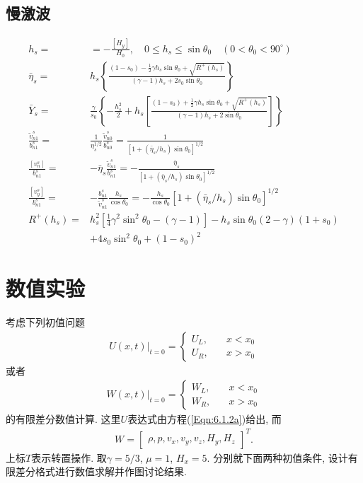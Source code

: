 \documentclass[10.5pt
]{article}
\begin{document}
\subsection{慢激波}
\begin{align}
h_s =&= -\frac{[H_y]}{H_0}, \quad 0 \le h_s \le \sin\theta_0 \quad (0 < \theta_0 < 90^\circ)
\\
\bar{\eta}_s =& h_s \left\{\frac{(1-s_0) - \frac{1}{2} \gamma h_s \sin\theta_0 +
\sqrt{R^+ (h_s)}}{(\gamma-1) h_s + 2 s_0 \sin\theta_0}\right\}
\\
\bar{Y}_s =& \frac{\gamma}{s_0} \left\{-\frac{h_s^2}{2} + h_s \left[\frac{(1-s_0) +
\frac{1}{2} \gamma h_s \sin\theta_0 + \sqrt{R^+ (h_s)}}{(\gamma-1) h_s + 2
\sin\theta_0}\right]\right\}
\\
\frac{\tilde{v}_{n1}^s}{b_{n1}^s} =& \frac{1}{\eta_s^{1/2}}
\frac{\tilde{v}_{n0}^s}{b_{n0}^s} = \frac{1}{[1+(\bar{\eta}_s/h_s)\sin\theta_0]^{1/2}}
\\
\frac{[v_n^s]}{b_{n1}^s} =& - \bar{\eta}_s \frac{\tilde{v}_{n1}^s}{b_{n1}^s} =
-\frac{\bar{\eta}_s}{[1+(\bar{\eta}_s/h_s)\sin\theta_0]^{1/2}}
\\
\frac{[v_y^s]}{b_{n1}^s} =& - \frac{b_{n1}^s}{\tilde{v}_{n1}^s}
\frac{h_s}{\cos\theta_0} = -\frac{h_s}{\cos\theta_0}
[1+(\bar{\eta}_s/h_s)\sin\theta_0]^{1/2}
\\
R^+(h_s) =& h_s^2 [\frac{1}{4} \gamma^2 \sin^2\theta_0 - (\gamma-1)] - h_s \sin\theta_0
(2-\gamma)(1+s_0) \nonumber
\\
& + 4s_0 \sin^2\theta_0 + (1-s_0)^2
\end{align}

\section{数值实验}

考虑下列初值问题
\begin{align}
U(x,t)|_{t=0} = \left\{ \begin{array}{ll}
U_L, & \quad x < x_0 \\
U_R, & \quad x > x_0
\end{array} \right.
\end{align}
或者
\begin{align}
W(x,t)|_{t=0} = \left\{ \begin{array}{ll}
W_L, & \quad x < x_0 \\
W_R, & \quad x > x_0
\end{array} \right.
\end{align}
的有限差分数值计算. 这里$U$表达式由方程(\ref{Eqn:6.1.2a})给出, 而
\begin{align}
W = \left[ \begin{array}{ccccccc}
\rho,
p,
v_x,
v_y,
v_z,
H_y,
H_z
\end{array} \right]^T.
\end{align}
上标$T$表示转置操作. 取$\gamma=5/3$, $\mu=1$, $H_x=5$. 分别就下面两种初值条件,
设计有限差分格式进行数值求解并作图讨论结果.
\end{document}
